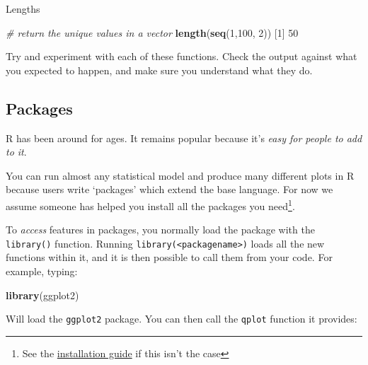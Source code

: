 \documentclass[]{article}
\newenvironment{Shaded}{\begin{snugshade}}{\end{snugshade}}
\newcommand{\CommentTok}[1]{\textcolor[rgb]{0.56,0.35,0.01}{\textit{#1}}}
\newcommand{\DataTypeTok}[1]{\textcolor[rgb]{0.13,0.29,0.53}{#1}}
\newcommand{\DecValTok}[1]{\textcolor[rgb]{0.00,0.00,0.81}{#1}}
\newcommand{\KeywordTok}[1]{\textcolor[rgb]{0.13,0.29,0.53}{\textbf{#1}}}
\newcommand{\NormalTok}[1]{#1}
\newcommand{\OperatorTok}[1]{\textcolor[rgb]{0.81,0.36,0.00}{\textbf{#1}}}
\let\rmarkdownfootnote\footnote%
\def\footnote{\protect\rmarkdownfootnote}
\begin{document}
Lengths

\begin{Shaded}
\begin{Highlighting}[]
\CommentTok{# return the unique values in a vector}
\KeywordTok{length}\NormalTok{(}\KeywordTok{seq}\NormalTok{(}\DecValTok{1}\NormalTok{,}\DecValTok{100}\NormalTok{, }\DecValTok{2}\NormalTok{))}
\NormalTok{[}\DecValTok{1}\NormalTok{] }\DecValTok{50}
\end{Highlighting}
\end{Shaded}

Try and experiment with each of these functions. Check the output against what
you expected to happen, and make sure you understand what they do.

\hypertarget{packages}{%
\subsection*{Packages}\label{packages}}

R has been around for ages. It remains popular because it's \emph{easy for people to
add to it}.

You can run almost any statistical model and produce many different plots in R
because users write `packages' which extend the base language. For now we assume
someone has helped you install all the packages you need\footnote{See the
  \href{installation.html}{installation guide} if this isn't the case}.

To \emph{access} features in packages, you normally load the package with the
\texttt{library()} function. Running \texttt{library(\textless{}packagename\textgreater{})} loads all the new
functions within it, and it is then possible to call them from your code. For
example, typing:

\begin{Shaded}
\begin{Highlighting}[]
\KeywordTok{library}\NormalTok{(ggplot2)}
\end{Highlighting}
\end{Shaded}

Will load the \texttt{ggplot2} package. You can then call the \texttt{qplot} function it
provides:

\begin{Shaded}
\end{Shaded}
\end{document}

